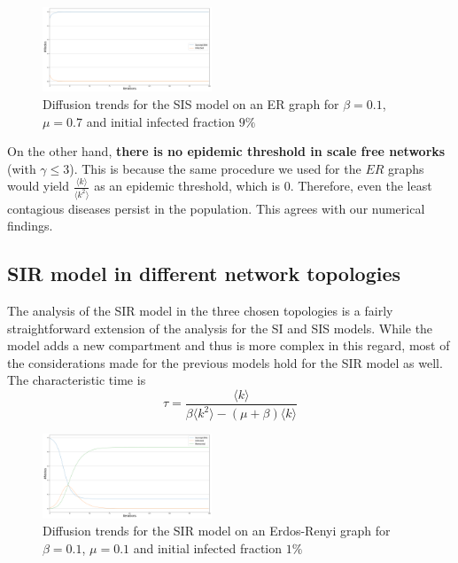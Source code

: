 \documentclass[sigchi]{acmart}
\begin{document}
\begin{figure}[!htbp]
    \centering
    \includegraphics[width=0.45\textwidth]{img/SIS/demonstrationDying.png}
    \caption{Diffusion trends for the SIS model on an ER graph for $\beta = 0.1$, $\mu = 0.7$ and initial infected fraction $9\%$}
    \label{fig:my_label}
\end{figure}
On the other hand, \textbf{there is no epidemic threshold in scale free networks} (with $\gamma \leq 3$). This is because the same procedure we used for the $ER$ graphs would yield $\frac{\langle k \rangle}{\langle k^2 \rangle}$ as an epidemic threshold, which is 0. Therefore, even the least contagious diseases persist in the population. This agrees with our numerical findings.
\subsection{SIR model in different network topologies}
The analysis of the SIR model in the three chosen topologies is a fairly straightforward extension of the analysis for the SI and SIS models. While the model adds a new compartment and thus is more complex in this regard, most of the considerations made for the previous models hold for the SIR model as well. The characteristic time is
$$\tau = \frac{\langle k \rangle}{\beta\langle k^2 \rangle-(\mu+\beta)\langle k \rangle}$$

\begin{figure}[!htbp]
    \centering
    \includegraphics[width=0.45\textwidth]{img/SIR/diffusionERSIR_beta=0.1_mu0.1_frac=0.01.png}
    \caption{Diffusion trends for the SIR model on an Erdos-Renyi graph for $\beta = 0.1$, $\mu = 0.1$ and initial infected fraction $1\%$}
    \label{fig:my_label}
\end{figure}
\end{document}
